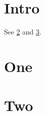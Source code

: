 \documentclass{article}
\begin{document}
\section{Intro}
See \cref{a:one} and \cref{a:two}.
\begin{appendices}
\section{One}\label{a:one}
\appendix
\section{Two}\label{a:two}
\end{appendices}
\end{document}
